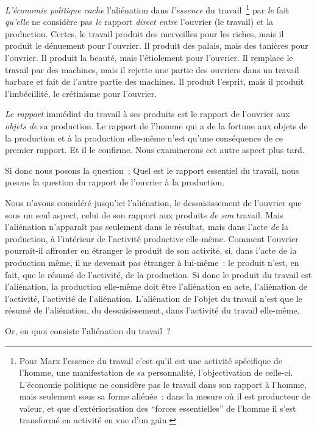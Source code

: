 \documentclass[french,twoside]{book} %
\begin{document}
\emph{L’économie politique cache} l’aliénation dans \emph{l’essence} du travail \footnote{Pour Marx l’essence du travail c’est qu’il est une activité spécifique de l’homme, une manifestation de sa personnalité, l’objectivation de celle-ci. L’économie politique ne considère pas le travail dans son rapport à l’homme, mais seulement sous sa forme aliénée : dans la mesure où il est producteur de valeur, et que d’extériorisation des “forces essentielles” de l’homme il s’est transformé en activité en vue d’un gain.} par \emph{le} fait \emph{qu’elle} ne considère pas \emph{le} rapport \emph{direct entre} l’ouvrier (le travail) et la production. Certes, le travail produit des merveilles pour les riches, mais il produit le dénuement pour l’ouvrier. Il produit des palais, mais des tanières pour l’ouvrier. Il produit la beauté, mais l’étiolement pour l’ouvrier. Il remplace le travail par des machines, mais il rejette une partie des ouvriers dans un travail barbare et fait de l’autre partie des machines. Il produit l’esprit, mais il produit l’imbécillité, le crétinisme pour l’ouvrier.\par
\emph{Le rapport} immédiat du travail à ses produits est le rapport de l’ouvrier aux \emph{objets de} sa production. Le rapport de l’homme qui a de la fortune aux objets de la production et à la production elle-même n’est qu’une conséquence de ce premier rapport. Et il le confirme. Nous examinerons cet autre aspect plus tard.\par
Si donc nous posons la question : Quel est le rapport essentiel du travail, nous posons la question du rapport de l’ouvrier à la production.\par
Nous n’avons considéré jusqu’ici l’aliénation, le dessaisissement de l’ouvrier que sous un seul aspect, celui de son rapport aux produits \emph{de son} travail. Mais l’aliénation n’apparaît pas seulement dans le résultat, mais dans l’acte \emph{de} la production, à l’intérieur de l’activité productive elle-même. Comment l’ouvrier pourrait-il affronter en étranger le produit de son activité, si, dans l’acte de la production même, il ne devenait pas étranger à lui-même : le produit n’est, en fait, que le résumé de l’activité, de la production. Si donc le produit du travail est l’aliénation, la production elle-même doit être l’aliénation en acte, l’aliénation de l’activité, l’activité de l’aliénation. L’aliénation de l’objet du travail n’est que le résumé de l’aliénation, du dessaisissement, dans l’activité du travail elle-même.\par
Or, en quoi consiste l’aliénation du travail ?\par
\end{document}
